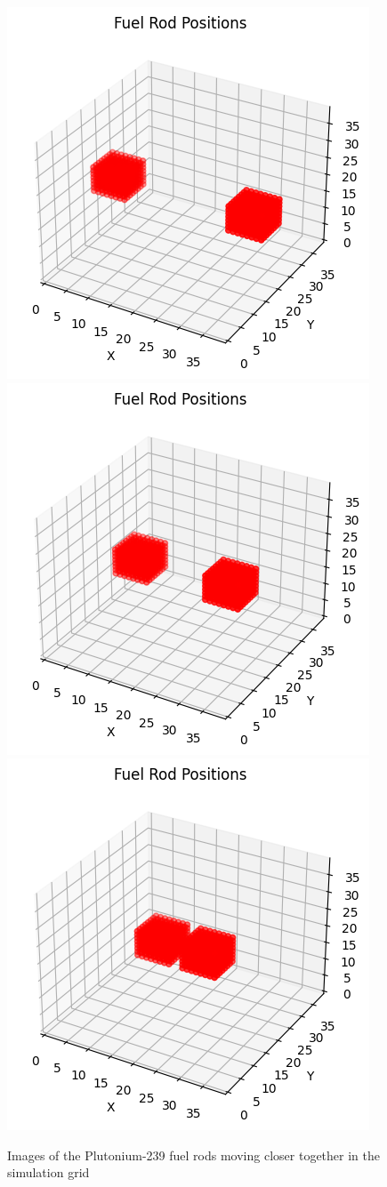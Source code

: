 \documentclass[letterpaper, 12pt]{article}
\begin{document}
         \begin{figure}[h!]
            \centering
            \includegraphics[width=0.3\linewidth]{Graphs/Graph_FuelRodsInGrid.png}
            \includegraphics[width=0.3\linewidth]{Graphs/Graph_FuelRodInGrid_Middle.png}
            \includegraphics[width=0.3\linewidth]{Graphs/GraphFuelRodInGrid_Close.png}
            \caption{Images of the Plutonium-239 fuel rods moving closer together in the simulation grid}
            \label{URANIUM-EXPLOSION-GRID}
         \end{figure}
\end{document}
